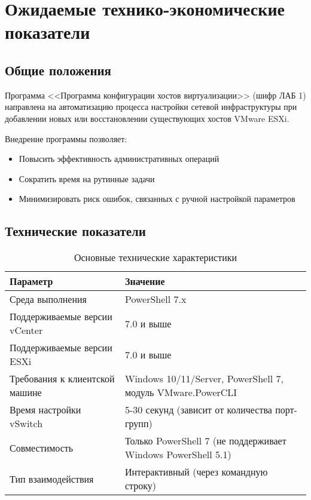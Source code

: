 \newpage

\section{Ожидаемые технико-экономические показатели}

\subsection{Общие положения}
Программа <<Программа конфигурации хостов виртуализации>> (шифр ЛАБ 1) направлена на автоматизацию процесса настройки сетевой инфраструктуры при добавлении новых или восстановлении существующих хостов VMware ESXi.

Внедрение программы позволяет:
\begin{itemize}
    \item Повысить эффективность административных операций
    \item Сократить время на рутинные задачи
    \item Минимизировать риск ошибок, связанных с ручной настройкой параметров
\end{itemize}

\subsection{Технические показатели}
\begin{table}[h]
\centering
\caption{Основные технические характеристики}
\begin{tabular}{|p{7cm}|p{8cm}|}
\hline
\textbf{Параметр} & \textbf{Значение} \\ \hline
Среда выполнения & PowerShell 7.x \\ \hline
Поддерживаемые версии vCenter & 7.0 и выше \\ \hline
Поддерживаемые версии ESXi & 7.0 и выше \\ \hline
Требования к клиентской машине & Windows 10/11/Server, PowerShell 7, модуль VMware.PowerCLI \\ \hline
Время настройки vSwitch & 5-30 секунд (зависит от количества порт-групп) \\ \hline
Совместимость & Только PowerShell 7 (не поддерживает Windows PowerShell 5.1) \\ \hline
Тип взаимодействия & Интерактивный (через командную строку) \\ \hline
\end{tabular}
\end{table}

